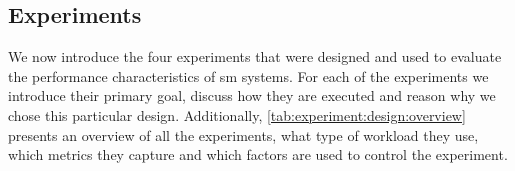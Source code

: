 \subsection{Experiments}
\label{sec:experiments:design:overview}

We now introduce the four experiments that were designed and used to evaluate the performance characteristics of \gls{sm} systems. For each of the experiments we introduce their primary goal, discuss how they are executed and reason why we chose this particular design. Additionally, \cref{tab:experiment:design:overview} presents an overview of all the experiments, what type of workload they use, which  metrics they capture and which factors  are used to control the experiment.









    
    
    

    
        
